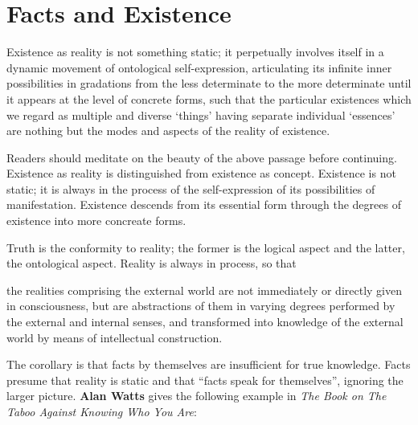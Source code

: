 \section{Facts and Existence}

\begin{quotex}
Existence as reality is not something static; it perpetually involves itself in a dynamic movement of ontological self-expression, articulating its infinite inner possibilities in gradations from the less determinate to the more determinate until it appears at the level of concrete forms, such that the particular existences which we regard as multiple and diverse `things' having separate individual `essences' are nothing but the modes and aspects of the reality of existence.
\end{quotex}


Readers should meditate on the beauty of the above passage before continuing. Existence as reality is distinguished from existence as concept. Existence is not static; it is always in the process of the self-expression of its possibilities of manifestation. Existence descends from its essential form through the degrees of existence into more concreate forms.

Truth is the conformity to reality; the former is the logical aspect and the latter, the ontological aspect. Reality is always in process, so that

\begin{quotex}
the realities comprising the external world are not immediately or directly given in consciousness, but are abstractions of them in varying degrees performed by the external and internal senses, and transformed into knowledge of the external world by means of intellectual construction.
\end{quotex}


The corollary is that facts by themselves are insufficient for true knowledge. Facts presume that reality is static and that ``facts speak for themselves'', ignoring the larger picture. \textbf{Alan Watts} gives the following example in \emph{The Book on The Taboo Against Knowing Who You Are}:

